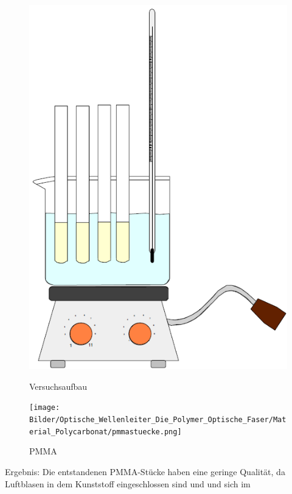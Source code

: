 \begin{figure}[h]
    \begin{center}
        \begin{minipage}[t]{0.4\textwidth}
            \begin{center}
                \includegraphics[height=0.1\textheight]{Bilder/Optische_Wellenleiter_Die_Polymer_Optische_Faser/Material_Polycarbonat/mmawasserbad.png}
                \caption[Versuchsaufbau]{Versuchsaufbau}
                \label{fig:mmawasserbad}
            \end{center}
        \end{minipage}
        \hspace{0.025\textwidth}
        \begin{minipage}[t]{0.4\textwidth}
            \begin{center}
                \texttt{[image: Bilder/Optische\_Wellenleiter\_Die\_Polymer\_Optische\_Faser/Material\_Polycarbonat/pmmastuecke.png]}
                \caption[PMMA]{PMMA}
                \label{fig:cdquillt}
            \end{center}
        \end{minipage}
    \end{center}
\end{figure}

Ergebnis:
Die entstandenen PMMA-Stücke haben eine geringe Qualität, da Luftblasen in dem Kunststoff eingeschlossen sind und und sich im
